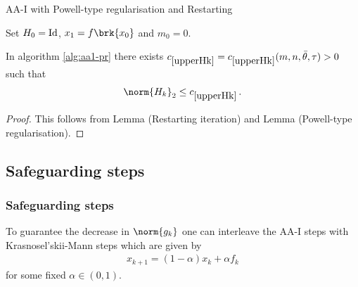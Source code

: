 \begin{frame}
	\begin{algorithm}[H]
	\caption{AA-I with Powell-type regularisation and Restarting}\label{alg:aa1-pr}
	\color{gray}
	\BlankLine
	Set $H_0=\operatorname{Id}$, $x_1=f\brk{x_0}$ and {\black $m_0 = 0$}.
	
	\end{algorithm}
\end{frame}

\begin{frame}
	\begin{lemma}
		In algorithm \ref{alg:aa1-pr} there exists $\useconstant{upperHk}=\useconstant{upperHk}(m,n, \bartheta,\tau)>0$ such that
		\begin{align*}
			\norm{H_k}_2\leq \useconstant{upperHk}\,.
		\end{align*}
	\end{lemma}
	\begin{proof}
		This follows from Lemma (Restarting iteration) and Lemma (Powell-type regularisation).
	\end{proof}
\end{frame}

\begin{frame}
	\centering
	\scalebox{0.9}{
	
	}
\end{frame}


\subsection{Safeguarding steps}
\begin{frame}
	\frametitle{Safeguarding steps}
	To guarantee the decrease in $\norm{g_k}$ one can interleave the AA-I steps with Krasnosel'skii-Mann steps which are given by
	\begin{align*}
		x_{k+1}= (1-\alpha)x_k +\alpha f_k
	\end{align*}
	for some fixed $\alpha\in(0,1)$.
\end{frame}

